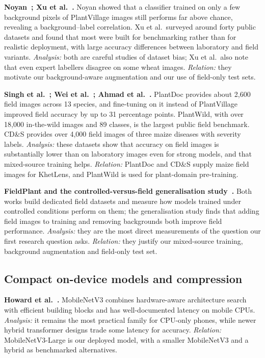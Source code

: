 \textbf{Noyan~\cite{noyan2022bias}; Xu et al.~\cite{xu2024datasets}.} Noyan showed that a classifier trained on only a few background pixels of PlantVillage images still performs far above chance, revealing a background--label correlation. Xu et al.\ surveyed around forty public datasets and found that most were built for benchmarking rather than for realistic deployment, with large accuracy differences between laboratory and field variants. \emph{Analysis:} both are careful studies of dataset bias; Xu et al.\ also note that even expert labellers disagree on some wheat images. \emph{Relation:} they motivate our background-aware augmentation and our use of field-only test sets.

\textbf{Singh et al.~\cite{singh2020plantdoc}; Wei et al.~\cite{wei2024plantwild}; Ahmad et al.~\cite{ahmad2021cds}.} PlantDoc provides about 2,600 field images across 13 species, and fine-tuning on it instead of PlantVillage improved field accuracy by up to 31 percentage points. PlantWild, with over 18,000 in-the-wild images and 89 classes, is the largest public field benchmark. CD\&S provides over 4,000 field images of three maize diseases with severity labels. \emph{Analysis:} these datasets show that accuracy on field images is substantially lower than on laboratory images even for strong models, and that mixed-source training helps. \emph{Relation:} PlantDoc and CD\&S supply maize field images for KhetLens, and PlantWild is used for plant-domain pre-training.

\textbf{FieldPlant and the controlled-versus-field generalisation study~\cite{fieldplant2023,gen2023fieldcond}.} Both works build dedicated field datasets and measure how models trained under controlled conditions perform on them; the generalisation study finds that adding field images to training and removing backgrounds both improve field performance. \emph{Analysis:} they are the most direct measurements of the question our first research question asks. \emph{Relation:} they justify our mixed-source training, background augmentation and field-only test set.

\subsection{Compact on-device models and compression}
\label{sec:lit-mobile}
\textbf{Howard et al.~\cite{howard2019mnv3}.} MobileNetV3 combines hardware-aware architecture search with efficient building blocks and has well-documented latency on mobile CPUs. \emph{Analysis:} it remains the most practical family for CPU-only phones, while newer hybrid transformer designs trade some latency for accuracy. \emph{Relation:} MobileNetV3-Large is our deployed model, with a smaller MobileNetV3 and a hybrid as benchmarked alternatives.

